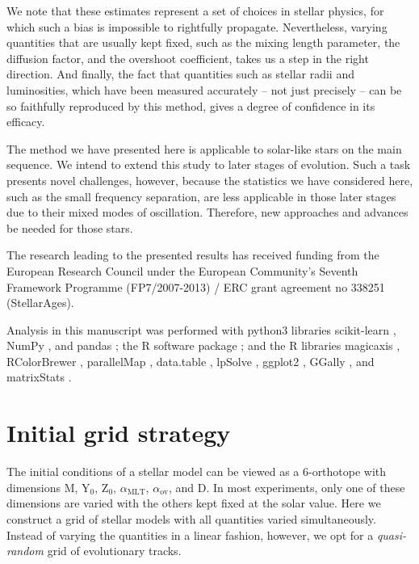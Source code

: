 \documentclass[manuscript]{aastex}
\begin{document}
We note that these estimates represent a set of choices in stellar physics, for which such a bias is impossible to rightfully propagate. Nevertheless, varying quantities that are usually kept fixed, such as the mixing length parameter, the diffusion factor, and the overshoot coefficient, takes us a step in the right direction. And finally, the fact that quantities such as stellar radii and luminosities, which have been measured accurately -- not just precisely -- can be so faithfully reproduced by this method, gives a degree of confidence in its efficacy. 

The method we have presented here is applicable to solar-like stars on the main sequence. We intend to extend this study to later stages of evolution. Such a task presents novel challenges, however, because the statistics we have considered here, such as the small frequency separation, are less applicable in those later stages due to their mixed modes of oscillation. Therefore, new approaches and advances be needed for those stars. 

\acknowledgments The research leading to the presented results has received funding from the European Research Council under the European Community's Seventh Framework Programme (FP7/2007-2013) / ERC grant agreement no 338251 (StellarAges). 

Analysis in this manuscript was performed with python3 libraries scikit-learn \citep{scikit-learn}, NumPy \citep{van2011numpy}, and pandas \citep{mckinney2010data}; the R software package \citep{R}; and the R libraries magicaxis \citep{magicaxis}, RColorBrewer \citep{RColorBrewer}, parallelMap \citep{parallelMap}, data.table \citep{data.table}, lpSolve \citep{lpSolve}, ggplot2 \citep{ggplot2}, GGally \citep{GGally}, and matrixStats \citep{matrixStats}. 

\appendix

\section{Initial grid strategy}
\label{sec:grid}
The initial conditions of a stellar model can be viewed as a 6-orthotope with dimensions M, Y$_0$, Z$_0$, $\alpha_{\text{MLT}}$, $\alpha_{\text{ov}}$, and D. In most experiments, only one of these dimensions are varied with the others kept fixed at the solar value. Here we construct a grid of stellar models with all quantities varied simultaneously. Instead of varying the quantities in a linear fashion, however, we opt for a \emph{quasi-random} grid of evolutionary tracks. 
\end{document}

